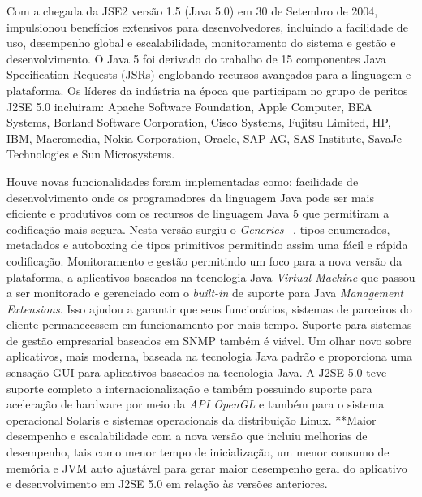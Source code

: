 Com a chegada da \acs{JSE2} versão 1.5 (Java 5.0) em 30 de Setembro de 2004, impulsionou benefícios extensivos para desenvolvedores, incluindo a facilidade de uso, desempenho global e escalabilidade, monitoramento do sistema e gestão e desenvolvimento. O Java 5 foi derivado do trabalho de 15 componentes Java Specification Requests (JSRs) englobando recursos avançados para a linguagem e plataforma. Os líderes da indústria na época que participam no grupo de peritos J2SE 5.0 incluiram: Apache Software Foundation, Apple Computer, BEA Systems, Borland Software Corporation, Cisco Systems, Fujitsu Limited, HP, IBM, Macromedia, Nokia Corporation, Oracle, SAP AG, SAS Institute, SavaJe Technologies e Sun Microsystems.

Houve novas funcionalidades foram implementadas como: facilidade de desenvolvimento onde os programadores da linguagem Java pode ser mais eficiente e produtivos com os recursos de linguagem Java 5 que permitiram a codificação mais segura. Nesta versão surgiu o {\it Generics} ~\cite{OracleGenerics, bracha1998gj}, tipos enumerados, metadados e autoboxing de tipos primitivos permitindo assim uma fácil e rápida codificação. Monitoramento e gestão permitindo um foco para a nova versão da plataforma, a aplicativos baseados na tecnologia Java {\it Virtual Machine} que passou a ser monitorado e gerenciado com o {\it built-in} de suporte para Java {\it Management Extensions}. Isso ajudou a garantir que seus funcionários, sistemas de parceiros do cliente permanecessem em funcionamento por mais tempo. Suporte para sistemas de gestão empresarial baseados em SNMP também é viável. Um olhar novo sobre aplicativos, mais moderna, baseada na tecnologia Java padrão e proporciona uma sensação GUI para aplicativos baseados na tecnologia Java. A J2SE 5.0 teve suporte completo a internacionalização e também possuindo suporte para aceleração de hardware por meio da {\it API OpenGL } e também para o sistema operacional Solaris e sistemas operacionais da distribuição Linux. **Maior desempenho e escalabilidade com a nova versão que incluiu melhorias de desempenho, tais como menor tempo de inicialização, um menor consumo de memória e JVM auto ajustável para gerar maior desempenho geral do aplicativo e desenvolvimento em J2SE 5.0 em relação às versões anteriores.

